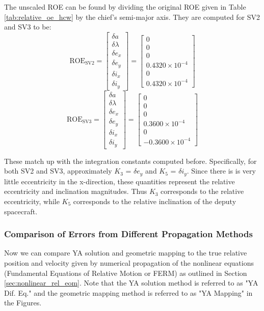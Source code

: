The unscaled ROE can be found by dividing the original ROE given in Table \ref{tab:relative_oe_hcw} by the chief's semi-major axis. They are computed for SV2 and SV3 to be:
\[
\text{ROE}_{\text{SV2}} = 
\begin{bmatrix}
\delta a \\ \delta \lambda \\ \delta e_x \\ \delta e_y \\ \delta i_x \\ \delta i_y
\end{bmatrix} =
\begin{bmatrix}
0 \\
0 \\
0 \\
0.4320 \times 10^{-4} \\
0 \\
0.4320 \times 10^{-4}
\end{bmatrix}
\]
\[
\text{ROE}_{\text{SV3}} = 
\begin{bmatrix}
\delta a \\ \delta \lambda \\ \delta e_x \\ \delta e_y \\ \delta i_x \\ \delta i_y
\end{bmatrix} =
\begin{bmatrix}
0 \\
0 \\
0 \\
0.3600 \times 10^{-4} \\
0 \\
-0.3600 \times 10^{-4}
\end{bmatrix}
\]

These match up with the integration constants computed before. Specifically, for both SV2 and SV3, approximately $K_3$ = $\delta e_y$ and $K_5$ = $\delta i_y$. Since there is is very little eccentricity in the x-direction, these quantities represent the relative eccentricity and inclination magnitudes. Thus $K_3$ corresponds to the relative eccentricity, while $K_5$ corresponds to the relative inclination of the deputy spacecraft. 


\subsubsection{Comparison of Errors from Different Propagation Methods}
Now we can compare YA solution and geometric mapping to the true relative position and velocity given by numerical propagation of the nonlinear equations (Fundamental Equations of Relative Motion or FERM) as outlined in Section \ref{sec:nonlinear_rel_eom}. Note that the YA solution method is referred to as "YA Dif. Eq." and the geometric mapping method is referred to as "YA Mapping" in the Figures. 

